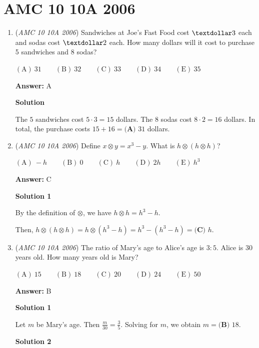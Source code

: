 \section{AMC 10 10A 2006}
        \begin{enumerate}
        	\item (\textit{AMC 10 10A 2006}) Sandwiches at Joe's Fast Food cost $\textdollar 3$ each and sodas cost $\textdollar 2$ each. How many dollars will it cost to purchase 5 sandwiches and 8 sodas?


 $\mathrm{(A)}\ 31\qquad\mathrm{(B)}\ 32\qquad\mathrm{(C)}\ 33\qquad\mathrm{(D)}\ 34\qquad\mathrm{(E)}\ 35$

 \textbf{Answer: }A



\textbf{Solution}

The $5$ sandwiches cost $5\cdot 3=15$ dollars. The $8$ sodas cost $8\cdot 2=16$ dollars. In total, the purchase costs $15+16=\boxed{\textbf{(A) }31}$ dollars.

 


	\item (\textit{AMC 10 10A 2006}) Define $x\otimes y=x^3-y$. What is $h\otimes (h\otimes h)$?


 $\mathrm{(A)}\ -h\qquad \mathrm{(B)}\ 0\qquad \mathrm{(C)}\ h\qquad \mathrm{(D)}\ 2h\qquad\mathrm{(E)}\ h^3$

 \textbf{Answer: }C



\textbf{Solution 1}

By the definition of $\otimes$, we have $h\otimes h=h^{3}-h$. 

 Then, $h\otimes (h\otimes h)=h\otimes (h^{3}-h)=h^{3}-(h^{3}-h)=\boxed{\textbf{(C) }h}.$



	\item (\textit{AMC 10 10A 2006}) The ratio of Mary's age to Alice's age is $3:5$. Alice is $30$ years old. How many years old is Mary?


 $\mathrm{(A)}\ 15\qquad\mathrm{(B)}\ 18\qquad\mathrm{(C)}\ 20\qquad\mathrm{(D)}\ 24\qquad\mathrm{(E)}\ 50$

 \textbf{Answer: }B



\textbf{Solution 1}

Let $m$ be Mary's age. Then $\frac{m}{30}=\frac{3}{5}$. Solving for $m$, we obtain $m=\boxed{\textbf{(B) }18}.$




\textbf{Solution 2}


\end{enumerate}
